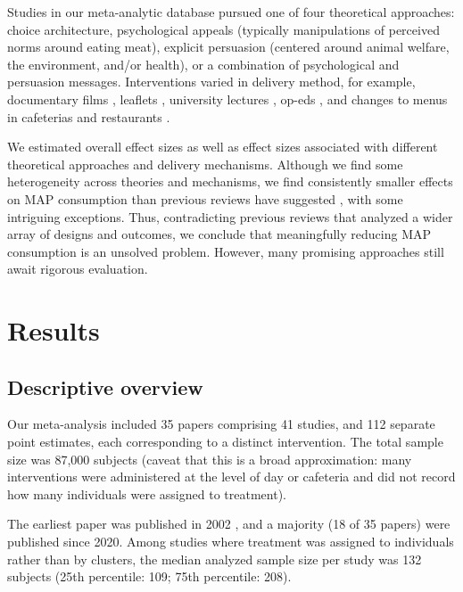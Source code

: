 \documentclass[sn-nature,referee,pdflatex]{sn-jnl}
\begin{document}
Studies in our meta-analytic database pursued one of four theoretical
approaches: choice architecture, psychological appeals (typically
manipulations of perceived norms around eating meat), explicit
persuasion (centered around animal welfare, the environment, and/or
health), or a combination of psychological and persuasion messages.
Interventions varied in delivery method, for example, documentary films
\citep{mathur2021effectiveness}, leaflets \citep{peacock2017},
university lectures \citep{jalil2023}, op-eds \citep{haile2021}, and
changes to menus in cafeterias \citep{andersson2021} and restaurants
\citep{coker2022, sparkman2021}.

We estimated overall effect sizes as well as effect sizes associated
with different theoretical approaches and delivery mechanisms. Although
we find some heterogeneity across theories and mechanisms, we find
consistently smaller effects on MAP consumption than previous reviews
have suggested
\citep{bianchi2018restructuring, byerly2018, chang2023, harguess2020, kwasny2022, mathur2021meta, meier2022, pandey2023},
with some intriguing exceptions. Thus, contradicting previous reviews
that analyzed a wider array of designs and outcomes, we conclude that
meaningfully reducing MAP consumption is an unsolved problem. However,
many promising approaches still await rigorous evaluation.

\section{Results}\label{sec2}

\subsection{Descriptive overview}\label{sec2.1}

Our meta-analysis included 35 papers comprising 41 studies, and 112
separate point estimates, each corresponding to a distinct intervention.
The total sample size was 87,000 subjects (caveat that this is a broad
approximation: many interventions were administered at the level of day
or cafeteria and did not record how many individuals were assigned to
treatment).

The earliest paper was published in 2002 \citep{allen2002}, and a
majority (18 of 35 papers) were published since 2020. Among studies
where treatment was assigned to individuals rather than by clusters, the
median analyzed sample size per study was 132 subjects (25th percentile:
109; 75th percentile: 208).
\end{document}
